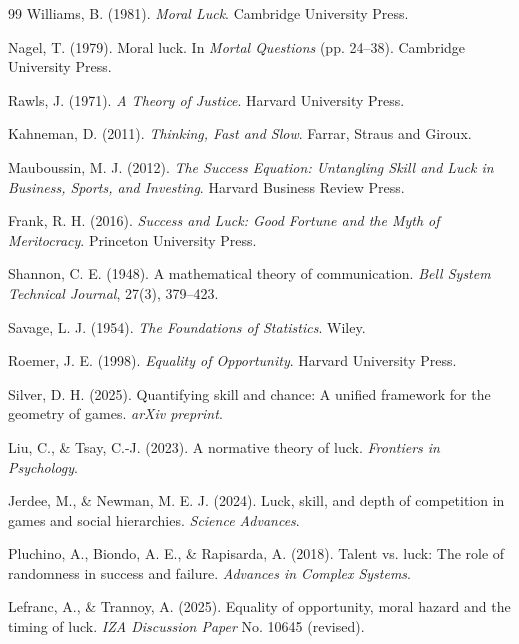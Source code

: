 %

\begin{thebibliography}{99}
   Williams, B. (1981). \textit{Moral Luck}.
    Cambridge University Press.

   Nagel, T. (1979). Moral luck. In \textit{Mortal
    Questions} (pp. 24--38). Cambridge University Press.

   Rawls, J. (1971). \textit{A Theory of Justice}.
    Harvard University Press.

   Kahneman, D. (2011). \textit{Thinking, Fast and
    Slow}. Farrar, Straus and Giroux.

   Mauboussin, M. J. (2012). \textit{The
    Success Equation: Untangling Skill and Luck in Business, Sports, and
    Investing}. Harvard Business Review Press.

   Frank, R. H. (2016). \textit{Success and Luck: Good
    Fortune and the Myth of Meritocracy}. Princeton University Press.

   Shannon, C. E. (1948). A mathematical theory of
    communication. \textit{Bell System Technical Journal}, 27(3), 379--423.

   Savage, L. J. (1954). \textit{The Foundations
    of Statistics}. Wiley.

   Roemer, J. E. (1998). \textit{Equality of
    Opportunity}. Harvard University Press.

   Silver, D. H. (2025). Quantifying skill and chance:
    A unified framework for the geometry of games. \textit{arXiv
    preprint}.

   Liu, C., \& Tsay, C.-J. (2023). A normative theory
    of luck. \textit{Frontiers in Psychology}.

   Jerdee, M., \& Newman, M. E. J. (2024). Luck,
    skill, and depth of competition in games and social hierarchies.
    \textit{Science Advances}.

   Pluchino, A., Biondo, A. E., \& Rapisarda, A.
    (2018). Talent vs. luck: The role of randomness in success and failure.
    \textit{Advances in Complex Systems}.

   Lefranc, A., \& Trannoy, A. (2025). Equality of
    opportunity, moral hazard and the timing of luck. \textit{IZA
    Discussion Paper} No. 10645 (revised).


\end{thebibliography}
